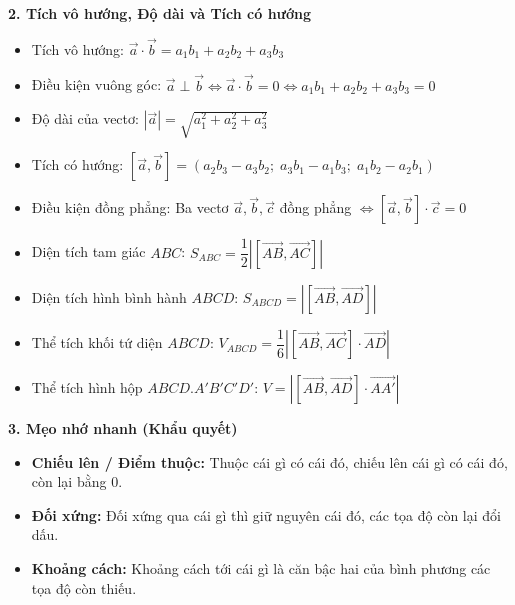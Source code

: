 \documentclass[12pt,a4paper]{article}
\begin{document}
\begin{theorybox}
    \vspace{0.15cm}
    \textbf{\textcolor{deepblue}{\large 2. Tích vô hướng, Độ dài và Tích có hướng}}
    \begin{itemize}\setlength{\itemsep}{5pt}
        \item Tích vô hướng: $\vec{a} \cdot \vec{b} = a_1 b_1 + a_2 b_2 + a_3 b_3$
        \item Điều kiện vuông góc: $\vec{a} \perp \vec{b} \iff \vec{a} \cdot \vec{b} = 0 \iff a_1 b_1 + a_2 b_2 + a_3 b_3 = 0$
        \item Độ dài của vectơ: $|\vec{a}| = \sqrt{a_1^2 + a_2^2 + a_3^2}$
        \item Tích có hướng: $[\vec{a}, \vec{b}] = \left( a_2b_3 - a_3b_2;\; a_3b_1 - a_1b_3;\; a_1b_2 - a_2b_1 \right)$
        \item Điều kiện đồng phẳng: Ba vectơ $\vec{a}, \vec{b}, \vec{c}$ đồng phẳng $\iff [\vec{a}, \vec{b}] \cdot \vec{c} = 0$
        \item Diện tích tam giác $ABC$: $S_{ABC} = \dfrac{1}{2} \left| [\vec{AB}, \vec{AC}] \right|$
        \item Diện tích hình bình hành $ABCD$: $S_{ABCD} = \left| [\vec{AB}, \vec{AD}] \right|$
        \item Thể tích khối tứ diện $ABCD$: $V_{ABCD} = \dfrac{1}{6} \left| [\vec{AB}, \vec{AC}] \cdot \vec{AD} \right|$
        \item Thể tích hình hộp $ABCD.A'B'C'D'$: $V = \left| [\vec{AB}, \vec{AD}] \cdot \vec{AA'} \right|$
    \end{itemize}

    \vspace{0.15cm}
    \textbf{\textcolor{amberorange}{\large 3. Mẹo nhớ nhanh (Khẩu quyết)}}
    \begin{itemize}\setlength{\itemsep}{6pt}
        \item \textbf{Chiếu lên / Điểm thuộc:} Thuộc cái gì có cái đó, chiếu lên cái gì có cái đó, còn lại bằng $0$.
        \item \textbf{Đối xứng:} Đối xứng qua cái gì thì giữ nguyên cái đó, các tọa độ còn lại đổi dấu.
        \item \textbf{Khoảng cách:} Khoảng cách tới cái gì là căn bậc hai của bình phương các tọa độ còn thiếu.
    \end{itemize}
\end{theorybox}

\newpage

\end{document}
